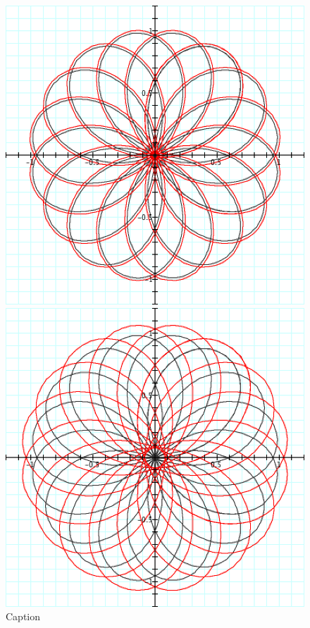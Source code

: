 \begin{figure}[H] 
  \label{polar-2} 
  \begin{minipage}[b]{0.5\linewidth}
    \centering
    \includegraphics[width=.9\linewidth]{parametric-polar-img/Fig 35.png} 
    \caption{Caption} 
    \label{fig:fig35}
    \vspace{4ex}
  \end{minipage} %
  \begin{minipage}[b]{0.5\linewidth}
    \centering
    \includegraphics[width=.9\linewidth]{parametric-polar-img/Fig 36.png} 

\end{minipage}
\end{figure}

